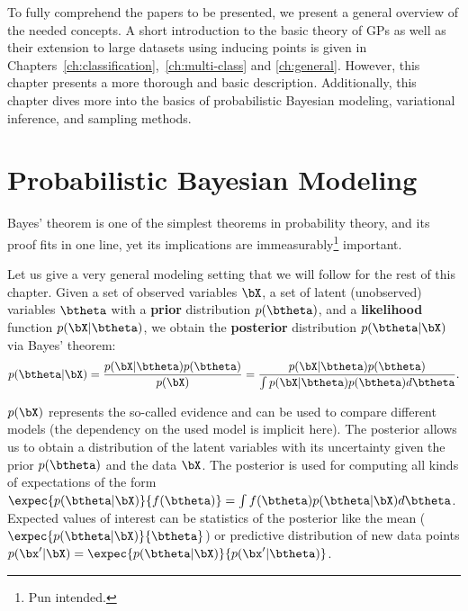 


\graphicspath{{2_background/figures/}}

To fully comprehend the papers to be presented, we present a general overview of the needed concepts.
A short introduction to the basic theory of \acl{GPs} as well as their extension to large datasets using inducing points \cite{Titsias2009} is given in Chapters~\ref{ch:classification},~\ref{ch:multi-class} and \ref{ch:general}.
However, this chapter presents a more thorough and basic description.
Additionally, this chapter dives more into the basics of probabilistic Bayesian modeling, variational inference, and sampling methods.

\section{Probabilistic Bayesian Modeling}

\label{sec:prob_bayes}

Bayes' theorem is one of the simplest theorems in probability theory, and its proof fits in one line, yet its implications are immeasurably\footnote{Pun intended.} important.

Let us give a very general modeling setting that we will follow for the rest of this chapter.
Given a set of observed variables $\bX$, a set of latent (unobserved) variables $\btheta$ with a \textbf{prior} distribution $p(\btheta)$, and a \textbf{likelihood} function $p(\bX|\btheta)$, we obtain the \textbf{posterior} distribution $p(\btheta|\bX)$ via Bayes' theorem:
\begin{align}
p(\btheta|\bX) = \frac{p(\bX|\btheta)p(\btheta)}{p(\bX)} = \frac{p(\bX|\btheta)p(\btheta)}{\int p(\bX|\btheta)p(\btheta)d\btheta}.
\label{eq:bayes}
\end{align}

$p(\bX)$ represents the so-called evidence and can be used to compare different models (the dependency on the used model is implicit here).
The posterior allows us to obtain a distribution of the latent variables with its uncertainty given the prior $p(\btheta)$ and the data $\bX$.
The posterior is used for computing all kinds of expectations of the form $\expec{p(\btheta|\bX)}{f(\btheta)} = \int f(\btheta)p(\btheta|\bX)d\btheta$.
Expected values of interest can be statistics of the posterior like the mean ($\expec{p(\btheta|\bX)}{\btheta}$) or predictive distribution of new data points $p(\bx'|\bX) = \expec{p(\btheta|\bX)}{p(\bx'|\btheta)}$.

